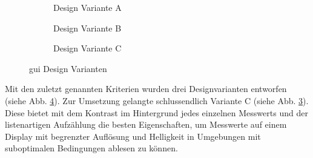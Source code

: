 \begin{figure}[H]
    	\begin{subfigure}[t]{0.49\textwidth}
    		\centering
    		\caption{Design Variante A \label{fig:variante_a}}
    	\end{subfigure}
        \hfill
    	\begin{subfigure}[t]{0.49\textwidth}
    		\centering
    		\caption{Design Variante B \label{fig:variante_b}}
    	\end{subfigure}
    \begin{subfigure}[t]{\textwidth}
		\centering
		\caption{Design Variante C \label{fig:variante_c}}
	\end{subfigure}
	\caption{\acs{gui} Design Varianten \label{fig:design_varianten}}
\end{figure}

Mit den zuletzt genannten Kriterien wurden drei Designvarianten entworfen (siehe Abb. \ref{fig:design_varianten}). Zur Umsetzung gelangte schlussendlich Variante C (siehe Abb. \ref{fig:variante_c}). Diese bietet mit dem Kontrast im Hintergrund jedes einzelnen Messwerts und der listenartigen Aufzählung die besten Eigenschaften, um Messwerte auf einem Display mit begrenzter Auflösung und Helligkeit in Umgebungen mit suboptimalen Bedingungen ablesen zu können. 

